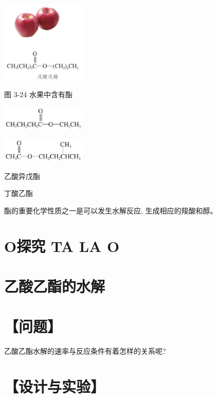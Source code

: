 \documentclass[10pt]{article}
\begin{document}
\begin{center}
\includegraphics[max width=0.3\textwidth]{images/0190efc5-b58a-7c43-bfb0-e0a030df9cfd_82_587431.jpg}
\end{center}

图 3-24 水果中含有酯

\begin{center}
\includegraphics[max width=0.3\textwidth]{images/0190efc5-b58a-7c43-bfb0-e0a030df9cfd_82_964822.jpg}
\end{center}

\begin{center}
\includegraphics[max width=0.3\textwidth]{images/0190efc5-b58a-7c43-bfb0-e0a030df9cfd_82_941005.jpg}
\end{center}

乙酸异戊酯

丁酸乙酯

酯的重要化学性质之一是可以发生水解反应, 生成相应的羧酸和醇。

\section*{O探究 TA LA O}

\section*{乙酸乙酯的水解}

\section*{【问题】}

乙酸乙酯水解的速率与反应条件有着怎样的关系呢?

\section*{【设计与实验】}
\end{document}
